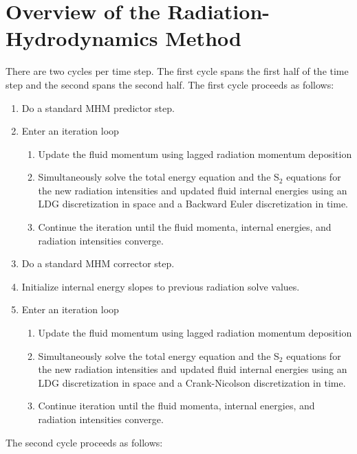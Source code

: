 \documentclass[preprint,12pt]{elsarticle}
\begin{document}
\section{Overview of the Radiation-Hydrodynamics Method}
\label{sec:Method}

There are two cycles per time step.  The first cycle spans the first half of the time step and the second 
spans the second half.  The first cycle proceeds as follows:
\begin{enumerate}
  \item Do a standard MHM predictor step. 
  \item Enter an iteration loop
  \begin{enumerate}
    \item Update the fluid momentum using lagged radiation momentum deposition
    \item Simultaneously solve the total energy equation and the S$_2$ equations for the new radiation intensities and updated fluid internal energies 
		using an LDG discretization in space and a Backward Euler discretization in time.
    \item Continue the iteration until the fluid momenta, internal energies, and radiation intensities converge.
  \end{enumerate}
  \item Do a standard MHM corrector step.
  \item Initialize internal energy slopes to previous radiation solve values.
  \item Enter an iteration loop
  \begin{enumerate}
    \item Update the fluid momentum using lagged radiation momentum deposition
    \item Simultaneously solve the total energy equation and the S$_2$ equations for the new radiation intensities and updated fluid internal energies 
		using an LDG discretization in space and a Crank-Nicolson discretization in time.
    \item Continue iteration until the fluid momenta, internal energies, and radiation intensities converge.
  \end{enumerate}
\end{enumerate}
The second cycle proceeds as follows:
\end{document}
